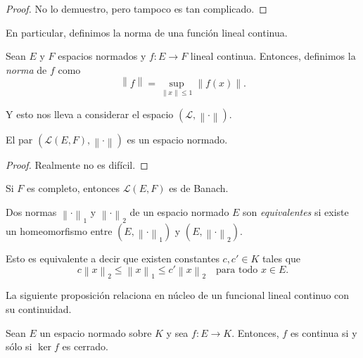 \begin{proof}
	No lo demuestro, pero tampoco es tan complicado.
\end{proof}

En particular, definimos la norma de una función lineal continua.

\begin{definition}
	Sean $E$ y $F$ espacios normados y $f : E \to F$ lineal continua. Entonces, definimos la \emph{norma} de $f$ como
	\begin{equation*}
		\left\lVert f \right\rVert = \sup_{\left\lVert x \right\rVert \leq 1} \left\lVert f(x) \right\rVert.
	\end{equation*}
\end{definition}

Y esto nos lleva a considerar el espacio $(\mathcal{L}, \left\lVert \cdot \right\rVert)$.

\begin{proposition}
	El par $(\mathcal{L}(E, F), \left\lVert \cdot \right\rVert)$ es un espacio normado.
\end{proposition}

\begin{proof}
	Realmente no es difícil.
\end{proof}

\begin{remark}
	Si $F$ es completo, entonces $\mathcal{L}(E, F)$ es de Banach.
\end{remark}

\begin{definition}
	Dos normas $\left\lVert \cdot \right\rVert_1$ y $\left\lVert \cdot \right\rVert_2$ de un espacio normado $E$ son \emph{equivalentes} si existe un homeomorfismo entre $(E, \left\lVert \cdot \right\rVert_1)$ y $(E, \left\lVert \cdot \right\rVert_2)$.
\end{definition}

\begin{remark}
	Esto es equivalente a decir que existen constantes $c, c' \in K$ tales que
	\begin{equation*}
		c \left\lVert x \right\rVert_2 \leq \left\lVert x \right\rVert_1 \leq c' \left\lVert x \right\rVert_2 \quad \text{para todo }x \in E.
	\end{equation*}
\end{remark}

La siguiente proposición relaciona en núcleo de un funcional lineal continuo con su continuidad.

\begin{proposition}
	Sean $E$ un espacio normado sobre $K$ y sea $f : E \to K$. Entonces, $f$ es continua si y sólo si $\ker f$ es cerrado.
\end{proposition}

